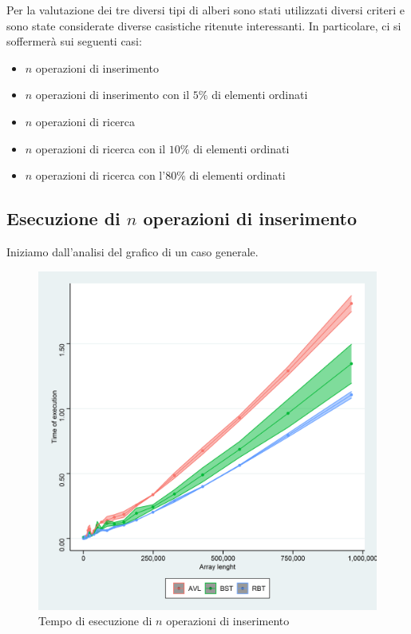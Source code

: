 \documentclass{article}
\begin{document}
	Per la valutazione dei tre diversi tipi di alberi sono stati utilizzati diversi criteri e sono state considerate diverse casistiche ritenute interessanti. In particolare, ci si soffermerà sui seguenti casi:
	
	\begin{itemize}
		\item $n$ operazioni di inserimento
		\item $n$ operazioni di inserimento con il $5\%$ di elementi ordinati
		\item $n$ operazioni di ricerca
		\item $n$ operazioni di ricerca con il $10\%$ di elementi ordinati 
		\item $n$ operazioni di ricerca con l'$80\%$ di elementi ordinati 
	\end{itemize}
	
	\newpage
	
	\subsection{Esecuzione di $n$ operazioni di inserimento}
	\label{subsection:n_op_ins}
	Iniziamo dall'analisi del grafico di un caso generale.
	
	\begin{figure}[h!]
		\centering
  		\includegraphics[width=1 \columnwidth]{Grafici/Grafico_All.png}
  		\caption{Tempo di esecuzione di $n$ operazioni di inserimento}
  		\label{fig:graph2}
	\end{figure}
	
\end{document}
